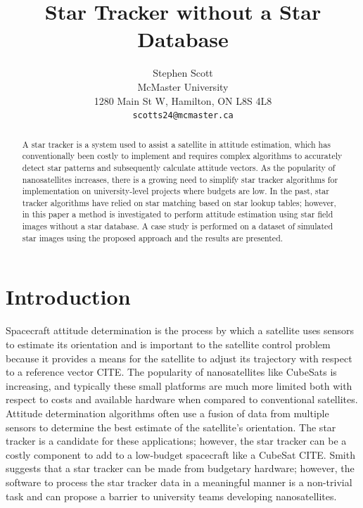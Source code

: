 \documentclass[10pt,twocolumn,letterpaper]{article}
\begin{document}
\title{Star Tracker without a Star Database}

\author{Stephen Scott\\
McMaster University\\
1280 Main St W, Hamilton, ON L8S 4L8\\
{\tt\small scotts24@mcmaster.ca}
}
\maketitle

\begin{abstract}
   A star tracker is a system used to assist a satellite in attitude estimation, which has conventionally been costly to implement and requires complex algorithms to accurately detect star patterns and subsequently calculate attitude vectors. As the popularity of nanosatellites increases, there is a growing need to simplify star tracker algorithms for implementation on university-level projects where budgets are low. In the past, star tracker algorithms have relied on star matching based on star lookup tables; however, in this paper a method is investigated to perform attitude estimation using star field images without a star database. A case study is performed on a dataset of simulated star images using the proposed approach and the results are presented.
\end{abstract}

\section{Introduction}
\label{sec:intro}

Spacecraft attitude determination is the process by which a satellite uses sensors to estimate its orientation and is important to the satellite control problem because it provides a means for the satellite to adjust its trajectory with respect to a reference vector CITE. The popularity of nanosatellites like CubeSats is increasing, and typically these small platforms are much more limited both with respect to costs and available hardware when compared to conventional satellites. Attitude determination algorithms often use a fusion of data from multiple sensors to determine the best estimate of the satellite's orientation. The star tracker is a candidate for these applications; however, the star tracker can be a costly component to add to a low-budget spacecraft like a CubeSat CITE. Smith suggests that a star tracker can be made from budgetary hardware; however, the software to process the star tracker data in a meaningful manner is a non-trivial task and can propose a barrier to university teams developing nanosatellites. 
\end{document}
